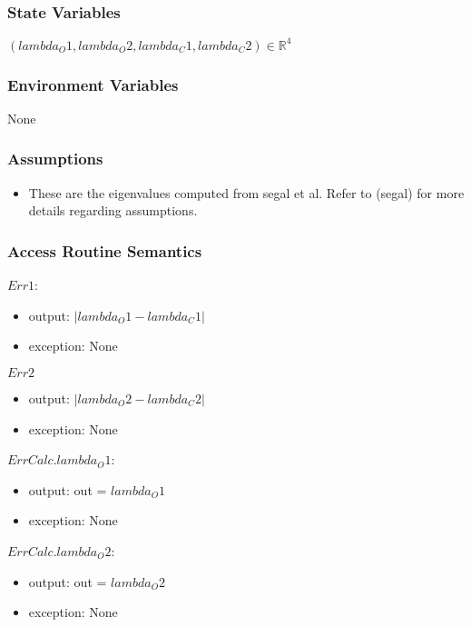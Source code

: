\documentclass[12pt, titlepage]{article}
\begin{document}
\subsubsection{State Variables}

$(lambda_O1,lambda_O2,lambda_C1,lambda_C2) \in \mathbb{R}^{4}$

\subsubsection{Environment Variables}

None

\subsubsection{Assumptions}

\begin{itemize}
	\item These are the eigenvalues computed from segal et al. Refer to (segal) 
	for more details regarding assumptions.
\end{itemize}

\subsubsection{Access Routine Semantics}


$Err1$:
\begin{itemize}
	\item output: $| lambda_O1 - lambda_C1| $ 
	\item exception: None
\end{itemize}


\noindent $Err2$
\begin{itemize} 
	\item output: $| lambda_O2 - lambda_C2| $ 
	\item exception: None
\end{itemize} 

\noindent $ErrCalc.lambda_O1$:
\begin{itemize}
	\item output: out = $lambda_O1$
	\item exception: None 
\end{itemize}

\noindent $ErrCalc.lambda_O2$:
\begin{itemize}
	\item output: out = $lambda_O2$
	\item exception: None
\end{itemize}
\end{document}
